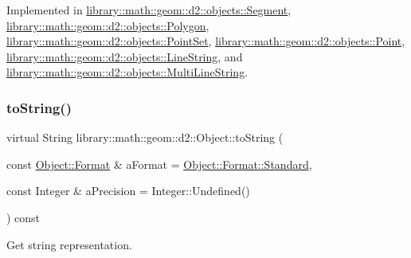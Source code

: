 Implemented in \hyperlink{classlibrary_1_1math_1_1geom_1_1d2_1_1objects_1_1_segment_abfe0b4983dcb9e26848d29a9b86d4b9c}{library\+::math\+::geom\+::d2\+::objects\+::\+Segment}, \hyperlink{classlibrary_1_1math_1_1geom_1_1d2_1_1objects_1_1_polygon_a028ca7818387654ed1aab1584cee6cc5}{library\+::math\+::geom\+::d2\+::objects\+::\+Polygon}, \hyperlink{classlibrary_1_1math_1_1geom_1_1d2_1_1objects_1_1_point_set_a652098938854c19294b5df8e8634cc9a}{library\+::math\+::geom\+::d2\+::objects\+::\+Point\+Set}, \hyperlink{classlibrary_1_1math_1_1geom_1_1d2_1_1objects_1_1_point_a74bef6325d728e1cb6e70bac0b8d4601}{library\+::math\+::geom\+::d2\+::objects\+::\+Point}, \hyperlink{classlibrary_1_1math_1_1geom_1_1d2_1_1objects_1_1_line_string_ae980ac86d1f2d8091151252aef2b6adc}{library\+::math\+::geom\+::d2\+::objects\+::\+Line\+String}, and \hyperlink{classlibrary_1_1math_1_1geom_1_1d2_1_1objects_1_1_multi_line_string_ab7854c1006501bf5159b890a662198b1}{library\+::math\+::geom\+::d2\+::objects\+::\+Multi\+Line\+String}.

\mbox{\label{classlibrary_1_1math_1_1geom_1_1d2_1_1_object_acdd76b3637732a249536b609dbe3f0eb}} 
\subsubsection{\texorpdfstring{to\+String()}{toString()}}
{\footnotesize\ttfamily virtual String library\+::math\+::geom\+::d2\+::\+Object\+::to\+String (\begin{DoxyParamCaption}\item[{const \hyperlink{classlibrary_1_1math_1_1geom_1_1d2_1_1_object_ac8cd61dada4960cfee9a469231621b17}{Object\+::\+Format} \&}]{a\+Format = {\ttfamily \hyperlink{classlibrary_1_1math_1_1geom_1_1d2_1_1_object_ac8cd61dada4960cfee9a469231621b17aeb6d8ae6f20283755b339c0dc273988b}{Object\+::\+Format\+::\+Standard}},  }\item[{const Integer \&}]{a\+Precision = {\ttfamily Integer\+:\+:Undefined()} }\end{DoxyParamCaption}) const\hspace{0.3cm}{\ttfamily [pure virtual]}}



Get string representation. 


